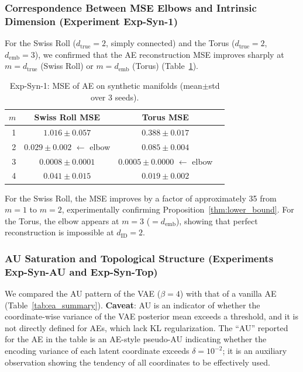 \documentclass[make,article,submit,pdftex,moreauthors]{Definitions/mdpi}
\newcommand{\dID}{d_{\mathrm{ID}}}
\newcommand{\dtrue}{d_{\mathrm{true}}}
\newcommand{\demb}{d_{\mathrm{emb}}}
\begin{document}
\subsubsection{Correspondence Between MSE Elbows and Intrinsic Dimension (Experiment Exp-Syn-1)}

For the Swiss Roll ($\dtrue = 2$, simply connected) and the Torus ($\dtrue = 2$, $\demb = 3$),
we confirmed that the AE reconstruction MSE improves sharply at $m = \dtrue$ (Swiss Roll) or $m = \demb$ (Torus)
(Table~\ref{tab:e1}).

\begin{table}[H]
\centering
\caption{Exp-Syn-1: MSE of AE on synthetic manifolds (mean$\pm$std over 3 seeds).}
\label{tab:e1}
\small
\begin{tabular}{rccc}
\toprule
$m$ & Swiss Roll MSE & Torus MSE \\
\midrule
1 & $1.016\pm0.057$ & $0.388\pm0.017$ \\
2 & $\boldsymbol{0.029\pm0.002}$ $\leftarrow$ elbow & $0.085\pm0.004$ \\
3 & $0.0008\pm0.0001$ & $\boldsymbol{0.0005\pm0.0000}$ $\leftarrow$ elbow \\
4 & $0.041\pm0.015$ & $0.019\pm0.002$ \\
\bottomrule
\end{tabular}
\end{table}

For the Swiss Roll, the MSE improves by a factor of approximately 35 from $m = 1$ to $m = 2$,
experimentally confirming Proposition~\ref{thm:lower_bound}.
For the Torus, the elbow appears at $m = 3$ ($= \demb$),
showing that perfect reconstruction is impossible at $\dID = 2$.

\subsubsection{AU Saturation and Topological Structure (Experiments Exp-Syn-AU and Exp-Syn-Top)}

We compared the AU pattern of the VAE ($\beta = 4$) with that of a vanilla AE (Table~\ref{tab:ea_summary}).
\textbf{Caveat}: AU is an indicator of whether the coordinate-wise variance of the VAE posterior mean exceeds a threshold,
and it is not directly defined for AEs, which lack KL regularization.
The ``AU'' reported for the AE in the table is an AE-style pseudo-AU indicating whether
the encoding variance of each latent coordinate exceeds $\delta = 10^{-2}$;
it is an auxiliary observation showing the tendency of all coordinates to be effectively used.
\end{document}
